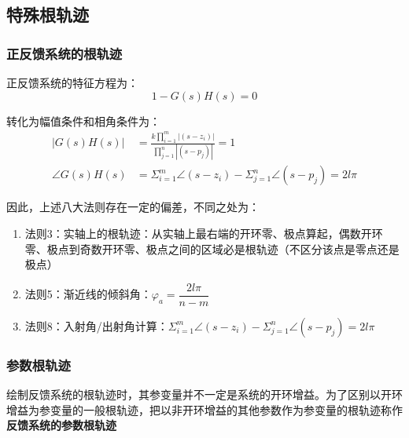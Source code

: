 \subsection{特殊根轨迹}

\subsubsection{正反馈系统的根轨迹}
正反馈系统的特征方程为：
\begin{equation*}
    1-G(s)H(s) = 0
\end{equation*}

转化为幅值条件和相角条件为：
\begin{equation*}
    \begin{split}
        \left\lvert G(s)H(s)\right\rvert  &= \frac{k\prod_{i=1}^m\left\lvert (s-z_i)\right\rvert }{\prod_{j=1}^n \left\lvert (s-p_j) \right\rvert } = 1\\
        \angle G(s)H(s) &= \Sigma_{i=1}^m\angle(s-z_i) - \Sigma_{j=1}^n \angle(s-p_j) = 2l\pi
    \end{split}
\end{equation*}

因此，上述八大法则存在一定的偏差，不同之处为：
\begin{enumerate}
    \item 法则3：实轴上的根轨迹：从实轴上最右端的开环零、极点算起，偶数开环零、极点到奇数开环零、极点之间的区域必是根轨迹（不区分该点是零点还是极点）
    \item 法则5：渐近线的倾斜角：$\varphi_a = \dfrac{2l\pi}{n-m}$
    \item 法则8：入射角/出射角计算：$\Sigma_{i=1}^m\angle(s-z_i) - \Sigma_{j=1}^n \angle(s-p_j) = 2l\pi$
\end{enumerate}

\subsubsection{参数根轨迹}

绘制反馈系统的根轨迹时，其参变量并不一定是系统的开环增益。为了区别以开环增益为参变量的一般根轨迹，把以非开环增益的其他参数作为参变量的根轨迹称作\textbf{反馈系统的参数根轨迹}

